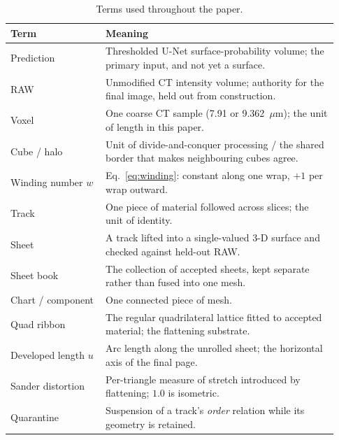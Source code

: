 \begin{table}[t]
  \caption{Terms used throughout the paper.}
  \label{tab:terms}
  \small
  \begin{tabular}{@{}p{0.27\linewidth}p{0.66\linewidth}@{}}
    \toprule
    Term & Meaning \\
    \midrule
    Prediction & Thresholded U-Net surface-probability volume; the primary input, and not yet a surface. \\
    RAW & Unmodified CT intensity volume; authority for the final image, held out from construction. \\
    Voxel & One coarse CT sample (7.91 or 9.362~$\mu$m); the unit of length in this paper. \\
    Cube / halo & Unit of divide-and-conquer processing / the shared border that makes neighbouring cubes agree. \\
    Winding number $w$ & Eq.~\eqref{eq:winding}: constant along one wrap, $+1$ per wrap outward. \\
    Track & One piece of material followed across slices; the unit of identity. \\
    Sheet & A track lifted into a single-valued 3-D surface and checked against held-out RAW. \\
    Sheet book & The collection of accepted sheets, kept separate rather than fused into one mesh. \\
    Chart / component & One connected piece of mesh. \\
    Quad ribbon & The regular quadrilateral lattice fitted to accepted material; the flattening substrate. \\
    Developed length $u$ & Arc length along the unrolled sheet; the horizontal axis of the final page. \\
    Sander distortion & Per-triangle measure of stretch introduced by flattening; $1.0$ is isometric. \\
    Quarantine & Suspension of a track's \emph{order} relation while its geometry is retained. \\
    \bottomrule
  \end{tabular}
\end{table}
